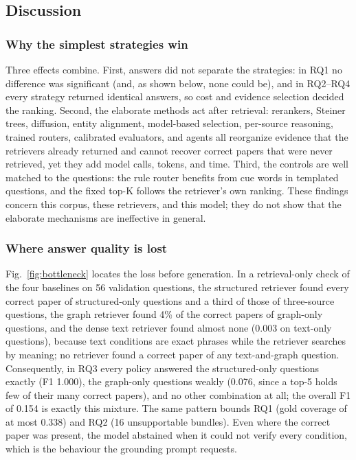 \documentclass[conference]{IEEEtran}
\begin{document}
\subsection{Discussion}\label{sec:discussion}

\subsubsection{Why the simplest strategies win}

Three effects combine. First, answers did not separate the strategies: in RQ1 no difference was significant (and, as shown below, none could be), and in RQ2--RQ4 every strategy returned identical answers, so cost and evidence selection decided the ranking. Second, the elaborate methods act after retrieval: rerankers, Steiner trees, diffusion, entity alignment, model-based selection, per-source reasoning, trained routers, calibrated evaluators, and agents all reorganize evidence that the retrievers already returned and cannot recover correct papers that were never retrieved, yet they add model calls, tokens, and time. Third, the controls are well matched to the questions: the rule router benefits from cue words in templated questions, and the fixed top-K follows the retriever's own ranking. These findings concern this corpus, these retrievers, and this model; they do not show that the elaborate mechanisms are ineffective in general.

\subsubsection{Where answer quality is lost}

Fig.~\ref{fig:bottleneck} locates the loss before generation. In a retrieval-only check of the four baselines on 56 validation questions, the structured retriever found every correct paper of structured-only questions and a third of those of three-source questions, the graph retriever found 4\% of the correct papers of graph-only questions, and the dense text retriever found almost none (0.003 on text-only questions), because text conditions are exact phrases while the retriever searches by meaning; no retriever found a correct paper of any text-and-graph question. Consequently, in RQ3 every policy answered the structured-only questions exactly (F1 1.000), the graph-only questions weakly (0.076, since a top-5 holds few of their many correct papers), and no other combination at all; the overall F1 of 0.154 is exactly this mixture. The same pattern bounds RQ1 (gold coverage of at most 0.338) and RQ2 (16 unsupportable bundles). Even where the correct paper was present, the model abstained when it could not verify every condition, which is the behaviour the grounding prompt requests.
\end{document}
